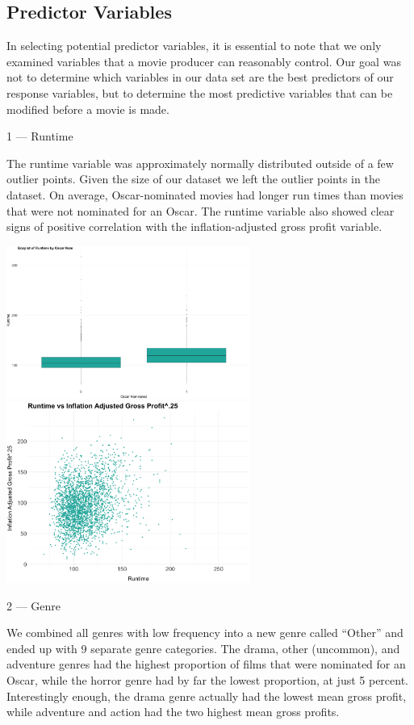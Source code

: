 \documentclass[10pt]{article}
\begin{document}
\subsection{Predictor Variables}

In selecting potential predictor variables, it is essential to note that we only examined variables that a movie producer can reasonably control. Our goal was not to determine which variables in our data set are the best predictors of our response variables, but to determine the most predictive variables that can be modified before a movie is made.

1 --- Runtime

The runtime variable was approximately normally distributed outside of a few outlier points. Given the size of our dataset we left the outlier points in the dataset. On average, Oscar-nominated movies had longer run times than movies that were not nominated for an Oscar. The runtime variable also showed clear signs of positive correlation with the inflation-adjusted gross profit variable.

\begin{center}
\includegraphics[width=8cm]{_assets/_eda/runtime_on.png}
\hspace{1cm}
\includegraphics[width=8cm]{_assets/_eda/runtime_iagp.png}
\end{center}


2 --- Genre

We combined all genres with low frequency into a new genre called “Other” and ended up with 9 separate genre categories. The drama, other (uncommon), and adventure genres had the highest proportion of films that were nominated for an Oscar, while the horror genre had by far the lowest proportion, at just 5 percent. Interestingly enough, the drama genre actually had the lowest mean gross profit, while adventure and action had the two highest mean gross profits.
\end{document}
